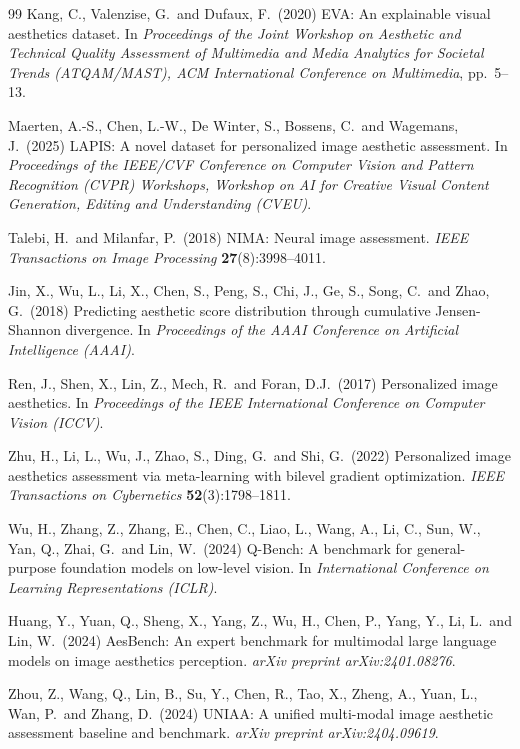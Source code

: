 \documentclass[10pt,twocolumn,letterpaper]{article}
\begin{document}
\begin{thebibliography}{99}
Kang, C., Valenzise, G.\ and Dufaux, F.\ (2020)
EVA: An explainable visual aesthetics dataset.
In {\it Proceedings of the Joint Workshop on Aesthetic and Technical Quality Assessment of
Multimedia and Media Analytics for Societal Trends (ATQAM/MAST), ACM International Conference
on Multimedia}, pp.\ 5--13.

Maerten, A.-S., Chen, L.-W., De Winter, S., Bossens, C.\ and Wagemans, J.\ (2025)
LAPIS: A novel dataset for personalized image aesthetic assessment.
In {\it Proceedings of the IEEE/CVF Conference on Computer Vision and Pattern Recognition (CVPR)
Workshops, Workshop on AI for Creative Visual Content Generation, Editing and Understanding (CVEU)}.

Talebi, H.\ and Milanfar, P.\ (2018)
NIMA: Neural image assessment.
{\it IEEE Transactions on Image Processing} {\bf 27}(8):3998--4011.

Jin, X., Wu, L., Li, X., Chen, S., Peng, S., Chi, J., Ge, S., Song, C.\ and Zhao, G.\ (2018)
Predicting aesthetic score distribution through cumulative Jensen-Shannon divergence.
In {\it Proceedings of the AAAI Conference on Artificial Intelligence (AAAI)}.

Ren, J., Shen, X., Lin, Z., Mech, R.\ and Foran, D.J.\ (2017)
Personalized image aesthetics.
In {\it Proceedings of the IEEE International Conference on Computer Vision (ICCV)}.

Zhu, H., Li, L., Wu, J., Zhao, S., Ding, G.\ and Shi, G.\ (2022)
Personalized image aesthetics assessment via meta-learning with bilevel gradient optimization.
{\it IEEE Transactions on Cybernetics} {\bf 52}(3):1798--1811.

Wu, H., Zhang, Z., Zhang, E., Chen, C., Liao, L., Wang, A., Li, C., Sun, W., Yan, Q., Zhai, G.\
and Lin, W.\ (2024)
Q-Bench: A benchmark for general-purpose foundation models on low-level vision.
In {\it International Conference on Learning Representations (ICLR)}.

Huang, Y., Yuan, Q., Sheng, X., Yang, Z., Wu, H., Chen, P., Yang, Y., Li, L.\ and Lin, W.\ (2024)
AesBench: An expert benchmark for multimodal large language models on image aesthetics perception.
{\it arXiv preprint arXiv:2401.08276}.

Zhou, Z., Wang, Q., Lin, B., Su, Y., Chen, R., Tao, X., Zheng, A., Yuan, L., Wan, P.\ and
Zhang, D.\ (2024)
UNIAA: A unified multi-modal image aesthetic assessment baseline and benchmark.
{\it arXiv preprint arXiv:2404.09619}.


\end{thebibliography}
\end{document}
